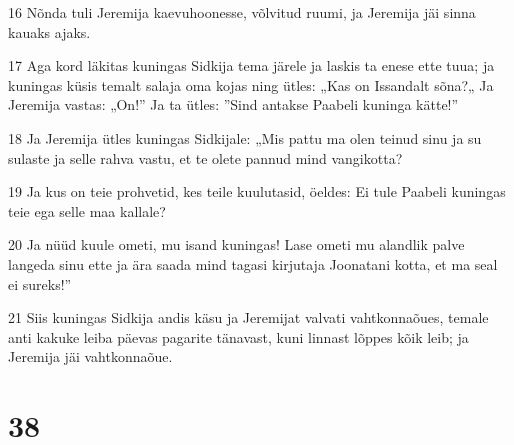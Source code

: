 \par 16 Nõnda tuli Jeremija kaevuhoonesse, võlvitud ruumi, ja Jeremija jäi sinna kauaks ajaks.
\par 17 Aga kord läkitas kuningas Sidkija tema järele ja laskis ta enese ette tuua; ja kuningas küsis temalt salaja oma kojas ning ütles: „Kas on Issandalt sõna?„ Ja Jeremija vastas: „On!” Ja ta ütles: ”Sind antakse Paabeli kuninga kätte!”
\par 18 Ja Jeremija ütles kuningas Sidkijale: „Mis pattu ma olen teinud sinu ja su sulaste ja selle rahva vastu, et te olete pannud mind vangikotta?
\par 19 Ja kus on teie prohvetid, kes teile kuulutasid, öeldes: Ei tule Paabeli kuningas teie ega selle maa kallale?
\par 20 Ja nüüd kuule ometi, mu isand kuningas! Lase ometi mu alandlik palve langeda sinu ette ja ära saada mind tagasi kirjutaja Joonatani kotta, et ma seal ei sureks!”
\par 21 Siis kuningas Sidkija andis käsu ja Jeremijat valvati vahtkonnaõues, temale anti kakuke leiba päevas pagarite tänavast, kuni linnast lõppes kõik leib; ja Jeremija jäi vahtkonnaõue.

\chapter{38}

